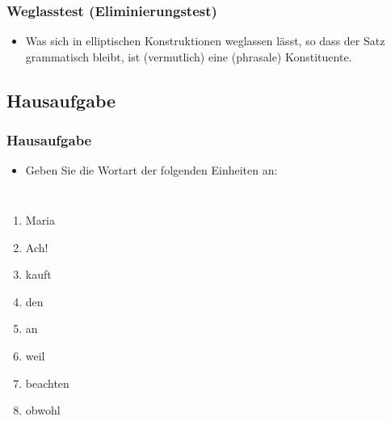 \begin{frame}
\frametitle{Weglasstest (Eliminierungstest)}

\begin{itemize}
	\item Was sich in elliptischen Konstruktionen weglassen lässt, so dass der Satz grammatisch bleibt, ist (vermutlich) eine (phrasale) Konstituente.

	\eal 
	\zl

\end{itemize}

\nocite{MyP18f}

\end{frame}


\subsection{Hausaufgabe}



\begin{frame}
\frametitle{Hausaufgabe}

\begin{itemize}
	\item Geben Sie die Wortart der folgenden Einheiten an:
\end{itemize}

\begin{columns}
	\begin{enumerate}
	\item Maria
	\item Ach!
	\item kauft
	\item den
	\item an
	\item weil
	\item beachten
	\item obwohl
	\end{enumerate}


\end{columns}

\end{frame}


